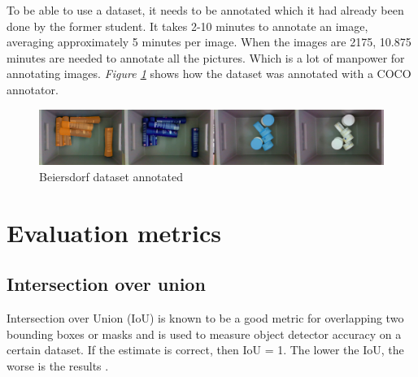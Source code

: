 To be able to use a dataset, it needs to be annotated which it had already been done by the former student. It takes 2-10 minutes to annotate an image, averaging approximately 5 minutes per image. When the images are 2175, 10.875 minutes are needed to annotate all the pictures. Which is a lot of manpower for annotating images. \textit{Figure \ref{fig:beiersdorfanno}} shows how the dataset was annotated with a COCO annotator\cite{brooks_jsbrokscoco-annotator_2021}.
\begin{figure}[h]
    \centering
    \includegraphics[width=1\textwidth,  angle =0]{graphics/methods/sverrirannotated.PNG}
    \caption{Beiersdorf dataset annotated\cite{bjarnason_1984-_detecting_2021}}
    \label{fig:beiersdorfanno}
\end{figure}

\section{Evaluation metrics}
\subsection{Intersection over union}
Intersection over Union (IoU) is known to be a good metric for overlapping two bounding boxes or masks and is used to measure object detector accuracy on a certain dataset. If the estimate is correct, then IoU = 1. The lower the IoU, the worse is the results \cite{sheremet_intersection_2020}.

